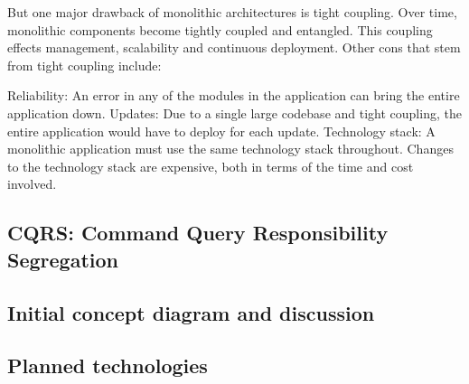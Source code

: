 But one major drawback of monolithic architectures is tight coupling.
Over time, monolithic components become tightly coupled and entangled.
This coupling effects management, scalability and continuous deployment.
Other cons that stem from tight coupling include:

Reliability: An error in any of the modules in the application can bring the entire application down.
Updates: Due to a single large codebase and tight coupling, the entire application would have to deploy for each update.
Technology stack: A monolithic application must use the same technology stack throughout.
Changes to the technology stack are expensive, both in terms of the time and cost involved.


\subsection{CQRS: Command Query Responsibility Segregation}\label{subsec:cqrs:-command-query-responsibility-segregation}

\subsection{Initial concept diagram and discussion}\label{subsec:initial-concept-diagram}

\subsection{Planned technologies}\label{subsec:planned-technologies}